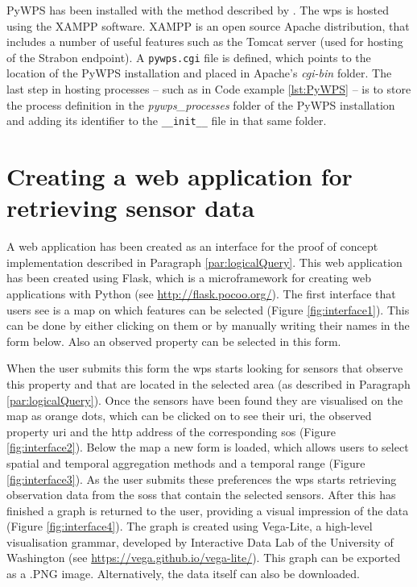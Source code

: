 PyWPS has been installed with the method described by \cite{wps:Deltares}. The \ac{wps} is hosted using the XAMPP software. XAMPP is an open source Apache distribution, that includes a number of useful features such as the Tomcat server (used for hosting of the Strabon endpoint). A \texttt{pywps.cgi} file is defined, which points to the location of the PyWPS installation and placed in Apache's \textit{cgi-bin} folder. The last step in hosting processes -- such as in Code example \ref{lst:PyWPS} -- is to store the process definition in the \textit{pywps\_processes} folder of the PyWPS installation and adding its identifier to the \texttt{\_\_init\_\_} file in that same folder.    

\section{Creating a web application for retrieving sensor data}
\label{par:webApp}
A web application has been created as an interface for the proof of concept implementation described in Paragraph \ref{par:logicalQuery}. This web application has been created using Flask, which is a microframework for creating web applications with Python (see \url{http://flask.pocoo.org/}). The first interface that users see is a map on which features can be selected (Figure \ref{fig:interface1}). This can be done by either clicking on them or by manually writing their names in the form below. Also an observed property can be selected in this form.

When the user submits this form the \ac{wps} starts looking for sensors that observe this property and that are located in the selected area (as described in Paragraph \ref{par:logicalQuery}). Once the sensors have been found they are visualised on the map as orange dots, which can be clicked on to see their \ac{uri}, the observed property \ac{uri} and the \ac{http} address of the corresponding \ac{sos} (Figure \ref{fig:interface2}). Below the map a new form is loaded, which allows users to select spatial and temporal aggregation methods and a temporal range (Figure \ref{fig:interface3}). As the user submits these preferences the \ac{wps} starts retrieving observation data from the \aclp{sos} that contain the selected sensors. After this has finished a graph is returned to the user, providing a visual impression of the data (Figure \ref{fig:interface4}). The graph is created using Vega-Lite, a high-level visualisation grammar, developed by Interactive Data Lab of the University of Washington (see \url{https://vega.github.io/vega-lite/}). This graph can be exported as a .PNG image. Alternatively, the data itself can also be downloaded.   


